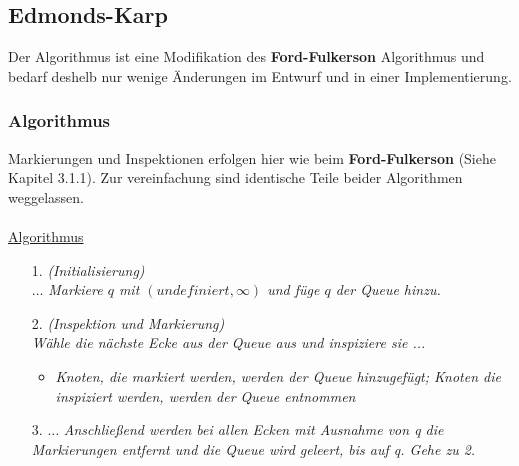 \documentclass[11pt]{article}
\begin{document}
    \subsection{Edmonds-Karp}
    Der Algorithmus ist eine Modifikation des \textbf{Ford-Fulkerson} Algorithmus und bedarf deshelb nur wenige \"Anderungen im Entwurf und in einer Implementierung.

    \subsubsection{Algorithmus}
    Markierungen und Inspektionen erfolgen hier wie beim \textbf{Ford-Fulkerson} (Siehe Kapitel 3.1.1). Zur vereinfachung sind identische Teile beider Algorithmen weggelassen.\\~\\
    \underline{Algorithmus}
    \begin{itemize}
        \item[1.] \textit{(Initialisierung)}\\
        $\ldots$ \textit{Markiere $q$ mit $(undefiniert, \infty)$ und f\"uge $q$ der Queue hinzu.}
        \item[2.] \textit{(Inspektion und Markierung)}\\
        \textit{W\"ahle die n\"achste Ecke aus der Queue aus und inspiziere sie ...}
        \begin{itemize}
            \item \textit{Knoten, die markiert werden, werden der Queue hinzugef\"ugt; Knoten die inspiziert werden, werden der Queue entnommen}
        \end{itemize}
        \item[3.] $\ldots$ \textit{Anschlie\ss{}end werden bei allen Ecken mit Ausnahme von q die Markierungen entfernt und die Queue wird geleert, bis auf q. Gehe zu 2.}
    \end{itemize}
\end{document}
